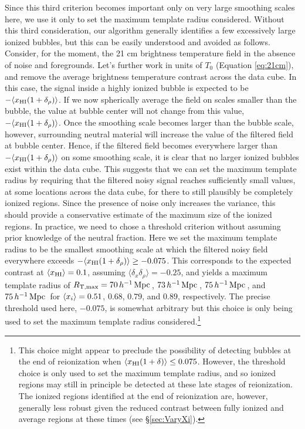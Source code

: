 Since this third criterion becomes important only on very large smoothing
scales here, we use it only to set the maximum template radius considered.
Without this third consideration, our algorithm generally identifies a few
excessively large ionized bubbles, but this can be easily understood
and avoided as follows. Consider, for the moment, the 21 cm brightness temperature
field in the absence of noise and foregrounds. Let's
further work in units of $T_0$ (Equation \ref{eq:21cm}), and
remove the average brightness temperature contrast across the data cube.
In this case, the signal inside a highly ionized bubble is 
expected to be $-\langle x_{\rm HI} (1 + \delta_\rho)\rangle$. If we now spherically average the field on scales 
smaller than the bubble, the value at bubble center will not change from 
this value, $-\langle x_{\rm HI} (1+\delta_\rho)\rangle$. Once
the smoothing scale becomes larger than the bubble scale, however, 
surrounding neutral
material will increase the value of the filtered field at bubble center. 
Hence, if the filtered field becomes everywhere larger than
$-\langle x_{\rm HI} (1 + \delta_\rho)\rangle$ on some smoothing scale, it is clear
that no larger ionized bubbles exist within the data cube. 
This suggests that we can set the maximum template radius 
by requiring that the filtered noisy signal reaches sufficiently
small values, at some locations across the data cube, for there to still plausibly be
completely ionized regions. Since the presence of noise only increases
the variance, this should provide a conservative estimate of the
maximum size of the ionized regions. In practice, we need to chose a threshold criterion without
assuming prior knowledge of the neutral fraction.
Here we set the maximum template radius to be the smallest smoothing
scale at which the filtered noisy field everywhere exceeds $-\langle x_{\rm HI} (1 + \delta_\rho)\rangle \geq - 0.075$. This corresponds to the expected contrast at $\langle x_{\text{HI}}\rangle = 0.1$, assuming $\langle\delta_x \delta_\rho\rangle=-0.25$, and yields a maximum template radius of 
$R_{\text{T,max}} = 70\,h^{-1}\,{\rm Mpc}\,$, $73\,h^{-1}\,{\rm Mpc}\,$, $75\,h^{-1}\,{\rm Mpc}\,$, and
$75\,h^{-1}\,{\rm Mpc}\,$ for $\langle x_{i} \rangle = 0.51$, $0.68$, $0.79$, and $0.89$, respectively.
The precise threshold used here, $-0.075$, is somewhat arbitrary but this choice 
is only being
used to set the maximum template radius considered.\footnote{This choice
might appear to preclude the possibility of detecting bubbles at the end of reionization when $\langle x_{\rm HI} (1 + \delta)\rangle \leq 0.075$. However, the
threshold choice is only used to set the maximum template radius, and
so ionized regions may still in principle be detected at these late
stages of reionization. The ionized regions identified 
at the end of reionization
are, however, generally less robust 
given the reduced contrast between fully ionized  
and average regions at these times (see \S \ref{sec:VaryXi}).}


